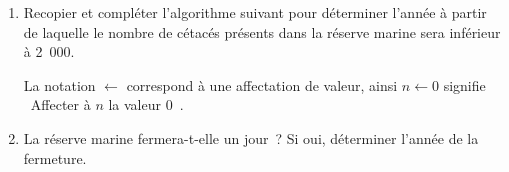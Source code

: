 \begin{enumerate}
\begin{enumerate}[label=\alph*.]
     \end{enumerate}
     \item Recopier et compléter l'algorithme suivant pour déterminer l'année à partir de laquelle le nombre de cétacés présents dans la réserve marine sera inférieur à 2~000.
     \begin{center}
\begin{extern}%
\end{extern}
     \end{center}
     La notation \og$\leftarrow$\fg{} correspond à une affectation de valeur, ainsi \og $n\leftarrow 0$\fg{} signifie \og~Affecter à $n$ la valeur $0$~\fg{}.
     \item La réserve marine fermera-t-elle un jour~? Si oui, déterminer l'année de la fermeture.
\end{enumerate}

